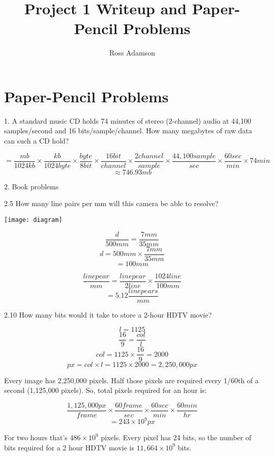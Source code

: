 \documentclass[11pt]{article}  %
\begin{document}

\title{Project 1 Writeup and Paper-Pencil Problems}

\author{Ross Adamson}

\maketitle

\section{Paper-Pencil Problems}

1. A standard music CD holds 74 minutes of stereo (2-channel) audio at 44,100 samples/second and 16 bits/sample/channel. How many megabytes of raw data can such a CD hold?

\[= \frac{mb}{1024kb} \times \frac{kb}{1024byte} \times \frac{byte}{8bit}
\times \frac{16bit}{channel} \times \frac{2channel}{sample}
\times \frac{44,100sample}{sec} \times \frac{60sec}{min}
\times 74min\]
\[\approx 746.93mb\]

2. Book problems

2.5 How many line pairs per mm will this camera be able to resolve?

\texttt{[image: diagram]}

\[\frac{d}{500mm} = \frac{7mm}{35mm}\]
\[d = 500mm \times \frac{7mm}{35mm}\]
\[= 100mm\]

\[\frac{linepear}{mm} = \frac{linepear}{2line}
\times \frac{1024line}{100mm}\]
\[= 5.12 \frac{linepears}{mm}\]

2.10 How many bits would it take to store a 2-hour HDTV movie?

\[l = 1125\]
\[\frac{16}{9} = \frac{col}{l}\]
\[col = 1125 \times \frac{16}{9} = 2000\]
\[px = col \times l = 1125 \times 2000 = 2,250,000px\]

Every image has 2,250,000 pixels. Half those pixels are required
every 1/60th of a second (1,125,000 pixels). So, total pixels required
for an hour is:

\[\frac{1,125,000px}{frame} \times \frac{60frame}{sec} \times
\frac{60sec}{min} \times \frac{60min}{hr}\]
\[= 243 \times 10^9px\]

For two hours that's $486 \times 10^9$ pixels. Every pixel has 24 bits, 
so the number of bits required for a 2 hour
HDTV movie is $11,664 \times 10^9$ bits.
\end{document}
